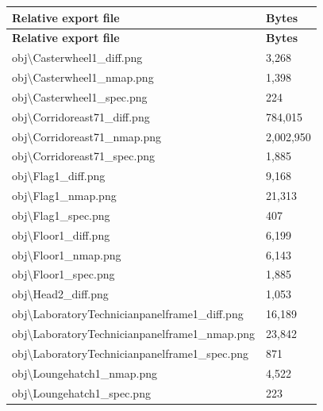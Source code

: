 \begin{longtable}{p{}p{}}
\toprule
\textbf{Relative export file} & \textbf{Bytes} \\ \midrule
\endfirsthead
\textbf{Relative export file} & \textbf{Bytes} \\ \midrule
\endhead
obj\textbackslash{}\allowbreak{}Casterwheel1\_\allowbreak{}diff.\allowbreak{}png & 3,268 \\
obj\textbackslash{}\allowbreak{}Casterwheel1\_\allowbreak{}nmap.\allowbreak{}png & 1,398 \\
obj\textbackslash{}\allowbreak{}Casterwheel1\_\allowbreak{}spec.\allowbreak{}png & 224 \\
obj\textbackslash{}\allowbreak{}Corridoreast71\_\allowbreak{}diff.\allowbreak{}png & 784,015 \\
obj\textbackslash{}\allowbreak{}Corridoreast71\_\allowbreak{}nmap.\allowbreak{}png & 2,002,950 \\
obj\textbackslash{}\allowbreak{}Corridoreast71\_\allowbreak{}spec.\allowbreak{}png & 1,885 \\
obj\textbackslash{}\allowbreak{}Flag1\_\allowbreak{}diff.\allowbreak{}png & 9,168 \\
obj\textbackslash{}\allowbreak{}Flag1\_\allowbreak{}nmap.\allowbreak{}png & 21,313 \\
obj\textbackslash{}\allowbreak{}Flag1\_\allowbreak{}spec.\allowbreak{}png & 407 \\
obj\textbackslash{}\allowbreak{}Floor1\_\allowbreak{}diff.\allowbreak{}png & 6,199 \\
obj\textbackslash{}\allowbreak{}Floor1\_\allowbreak{}nmap.\allowbreak{}png & 6,143 \\
obj\textbackslash{}\allowbreak{}Floor1\_\allowbreak{}spec.\allowbreak{}png & 1,885 \\
obj\textbackslash{}\allowbreak{}Head2\_\allowbreak{}diff.\allowbreak{}png & 1,053 \\
obj\textbackslash{}\allowbreak{}LaboratoryTechnicianpanelframe1\_\allowbreak{}diff.\allowbreak{}png & 16,189 \\
obj\textbackslash{}\allowbreak{}LaboratoryTechnicianpanelframe1\_\allowbreak{}nmap.\allowbreak{}png & 23,842 \\
obj\textbackslash{}\allowbreak{}LaboratoryTechnicianpanelframe1\_\allowbreak{}spec.\allowbreak{}png & 871 \\
obj\textbackslash{}\allowbreak{}Loungehatch1\_\allowbreak{}nmap.\allowbreak{}png & 4,522 \\
obj\textbackslash{}\allowbreak{}Loungehatch1\_\allowbreak{}spec.\allowbreak{}png & 223 \\

\end{longtable}
